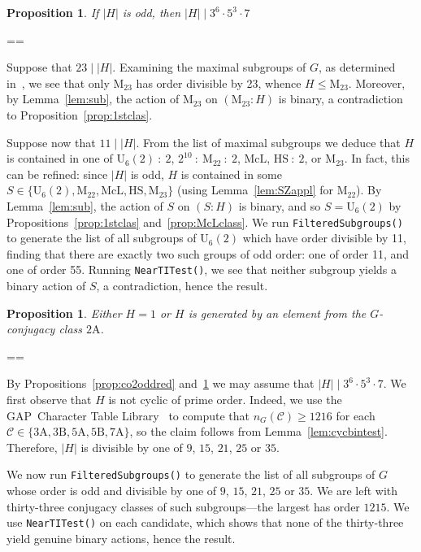 \documentclass[11pt, a4paper]{amsart}
\makeatletter
\newcommand{\gap}{{\sf GAP}}
\def\cn{\mathord{{\!\:{:}\:\!}}}
\newtheorem{prop}[thm]{Proposition}
\renewcommand{\proofname}{Proof}
\renewenvironment{proof}[1][\proofname]{\par
  \pushQED{\qed}  \normalfont \partopsep=\z@skip \topsep=\z@skip
  \trivlist
  \item[\hskip\labelsep
        \scshape
    #1\@addpunct{.}]\ignorespaces
}{  \popQED\endtrivlist\@endpefalse
}
\makeatother
\begin{document}
\begin{prop}\label{prop:co2no1123}
    If $|H|$ is odd, then $|H|\mid 3^6\cdot5^3\cdot 7$
\end{prop}
\begin{proof}
Suppose that $23\mid |H|$. Examining the maximal subgroups of $G$, as determined in~\cite{W83}, we see that only $\mathrm{M}_{23}$ has order divisible by 23, whence $H\leq \mathrm{M}_{23}$. Moreover, by Lemma~\ref{lem:sub}, the action of $\mathrm{M}_{23}$ on $(\mathrm{M}_{23}:H)$ is binary, a contradiction to Proposition~\ref{prop:1stclas}. 

Suppose now that $11\mid |H|$. From the list of maximal subgroups we deduce that $H$ is contained in one of $\mathrm{U}_6(2)\cn2$, $2^{10}\cn \mathrm{M}_{22}\cn 2$, $\mathrm{McL}$, $\mathrm{HS}\cn 2$, or $\mathrm{M}_{23}$. In fact, this can be refined: since $|H|$ is odd, $H$ is contained in some $S\in\{\mathrm{U}_6(2), \mathrm{M}_{22}, \mathrm{McL}, \mathrm{HS},\mathrm{M}_{23}\}$ (using Lemma~\ref{lem:SZappl} for $\mathrm{M}_{22}$). By Lemma~\ref{lem:sub}, the action of $S$ on $(S:H)$ is binary, and so $S=\mathrm{U}_{6}(2)$ by Propositions~\ref{prop:1stclas} and~\ref{prop:McLclass}. We run {\tt{FilteredSubgroups()}} to generate the list of all subgroups of $\mathrm{U}_6(2)$ which have order divisible by 11, finding that there are exactly two such groups of odd order: one of order 11, and one of order 55. Running {\tt{NearTITest()}}, we see that neither subgroup yields a binary action of $S$, a contradiction, hence the result.
\end{proof}

\begin{prop}\label{prop:co2class}
    Either $H=1$ or $H$ is generated by an element from the $G$-conjugacy class $\mathrm{2A}$.
\end{prop}
\begin{proof}
    By Propositions~\ref{prop:co2oddred} and~\ref{prop:co2no1123} we may assume that $|H|\mid 3^6\cdot 5^3\cdot 7$. We first observe that $H$ is not cyclic of prime order. Indeed, we use the \gap~Character Table Library~\cite{CTblLib1.3.11} to compute that $n_G(\mathcal{C})\geq1216$ for each $\mathcal{C}\in\{\mathrm{3A,3B,5A,5B,7A\}}$, so the claim follows from Lemma~\ref{lem:cycbintest}. Therefore, $|H|$ is divisible by one of $9$, $15$, $21$, $25$ or $35$.

    We now run {\tt{FilteredSubgroups()}} to generate the list of all subgroups of $G$ whose order is odd and divisible by one of $9$, $15$, $21$, $25$ or $35$. We are left with thirty-three conjugacy classes of such subgroups---the largest has order $1215$. We use {\tt{NearTITest()}} on each candidate, which shows that none of the thirty-three yield genuine binary actions, hence the result.
\end{proof}
\end{document}
